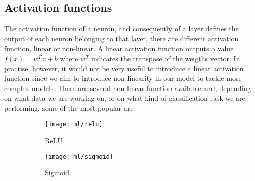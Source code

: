 \documentclass[a4paper,11pt]{article}
\begin{document}
\subsection{Activation functions}
The activation function of a neuron, and consequently of a layer defines the output of each neuron belonging to that layer, there are different activation function, linear or non-linear.
A linear activation function outputs a value $f(x) = w^T x + b$ where $w^T$ indicates the transpose of the weigths vector.
In practise, however, it would not be very useful to introduce a linear activation function since we aim to introduce non-linearity in our model to tackle more complex models.
There are several non-linear function available and, depending on what data we are working on, or on what kind of classification task we are performing, some of the most popular are


\begin{figure}[h!]
\centering
\begin{subfigure}{0.3\textwidth}
\texttt{[image: ml/relu]}
\caption{ReLU}
\label{}
\end{subfigure}
\begin{subfigure}{0.3\textwidth}
\texttt{[image: ml/sigmoid]}
\caption{Sigmoid}
\label{}
\end{subfigure}
\caption{}
\label{}
\end{figure}
\end{document}
